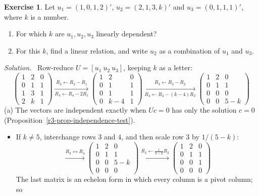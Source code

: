 \documentclass[12pt]{article}
\theoremstyle{definition}
\newtheorem{exercise}{Exercise}
\newenvironment{solution}{\par\noindent\textit{Solution.}\ }{\par\smallskip}
\begin{document}
\begin{exercise}\label{r3-dr-independence-parameter}
Let \(u_1=(1,0,1,2)'\), \(u_2=(2,1,3,k)'\) and \(u_3=(0,1,1,1)'\), where \(k\) is a number.
\begin{enumerate}
\item For which \(k\) are \(u_1,u_2,u_3\) linearly dependent?
\item For this \(k\), find a linear relation, and write \(u_2\) as a combination of \(u_1\) and \(u_3\).
\end{enumerate}
\end{exercise}
\begin{solution}
Row-reduce \(U=[u_1\ u_2\ u_3]\), keeping \(k\) as a letter:
\[
\begin{pmatrix}1&2&0\\0&1&1\\1&3&1\\2&k&1\end{pmatrix}
\xrightarrow[R_4\leftarrow R_4-2R_1]{R_3\leftarrow R_3-R_1}
\begin{pmatrix}1&2&0\\0&1&1\\0&1&1\\0&k-4&1\end{pmatrix}
\xrightarrow[R_4\leftarrow R_4-(k-4)R_2]{R_3\leftarrow R_3-R_2}
\begin{pmatrix}1&2&0\\0&1&1\\0&0&0\\0&0&5-k\end{pmatrix}
\]
(a) The vectors are independent exactly when \(Uc=0\) has only the solution \(c=0\)
(Proposition~\ref{r3-prop-independence-test}).
\begin{itemize}
\item If \(k\ne5\), interchange rows \(3\) and \(4\), and then scale row \(3\) by \(1/(5-k)\):
\[
\xrightarrow{R_3\leftrightarrow R_4}
\begin{pmatrix}1&2&0\\0&1&1\\0&0&5-k\\0&0&0\end{pmatrix}
\xrightarrow{R_3\leftarrow\frac1{5-k}R_3}
\begin{pmatrix}1&2&0\\0&1&1\\0&0&1\\0&0&0\end{pmatrix}
\]
The last matrix is an echelon form in which every column is a pivot column; so

\end{itemize}
\end{solution}
\end{document}
